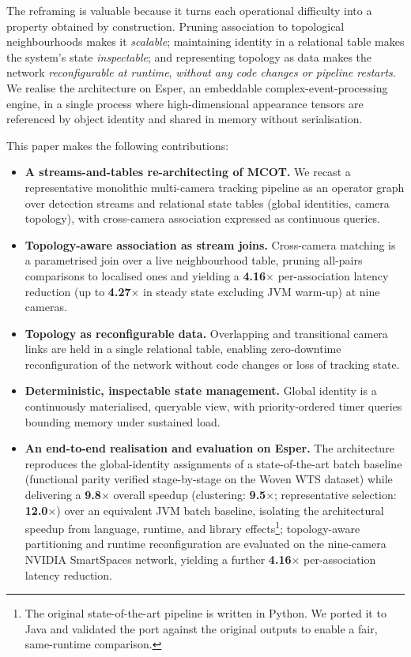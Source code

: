 \documentclass[5p,times]{elsarticle}
\begin{document}
The reframing is valuable because it turns each operational difficulty into a property obtained by construction. Pruning association to topological neighbourhoods makes it \emph{scalable}; maintaining identity in a relational table makes the system's state \emph{inspectable}; and representing topology
as data makes the network \emph{reconfigurable at runtime}, \emph{without any code changes or pipeline restarts}.
We realise the architecture on Esper, an embeddable complex-event-processing engine, in a single process where high-dimensional appearance tensors are referenced by object identity and shared
in memory without serialisation.

This paper makes the following contributions:
\begin{itemize}[leftmargin=*]
    \item \textbf{A streams-and-tables re-architecting of MCOT.} We recast a representative monolithic multi-camera tracking pipeline as an operator graph over detection streams and
    relational state tables (global identities, camera topology), with cross-camera association expressed as continuous queries.
    \item \textbf{Topology-aware association as stream joins.} Cross-camera matching is a parametrised join over a live neighbourhood table, pruning all-pairs comparisons to localised ones and yielding a \textbf{4.16$\times$} per-association latency reduction (up to \textbf{4.27$\times$} in steady state excluding JVM warm-up) at nine cameras.
    \item \textbf{Topology as reconfigurable data.} Overlapping and transitional camera links are held in a single relational table, enabling zero-downtime reconfiguration of the network
    without code changes or loss of tracking state.
    \item \textbf{Deterministic, inspectable state management.} Global identity is a continuously materialised, queryable view, with priority-ordered timer queries bounding memory under sustained load.
    \item \textbf{An end-to-end realisation and evaluation on Esper.} The architecture reproduces the global-identity assignments of a state-of-the-art batch baseline
    (functional parity verified stage-by-stage on the Woven WTS dataset) while delivering a \textbf{9.8$\times$} overall speedup (clustering: \textbf{9.5$\times$};
    representative selection: \textbf{12.0$\times$}) over an equivalent JVM batch baseline, isolating the architectural speedup from language, runtime, and library
    effects\footnote{The original state-of-the-art pipeline is written in Python. We ported it to Java and validated the port against the original outputs to enable a fair, 
    same-runtime comparison.}; topology-aware partitioning and runtime reconfiguration are evaluated on the nine-camera NVIDIA SmartSpaces network, yielding a further
    \textbf{4.16$\times$} per-association latency reduction.
\end{itemize}
\end{document}
